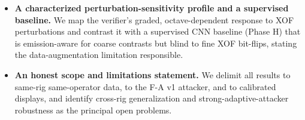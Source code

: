 \begin{itemize}
  \item \textbf{A characterized perturbation-sensitivity profile and a supervised baseline.} We map the verifier's graded, octave-dependent response to XOF perturbations and contrast it with a supervised CNN baseline (Phase H) that is emission-aware for coarse contrasts but blind to fine XOF bit-flips, stating the data-augmentation limitation responsible.

  \item \textbf{An honest scope and limitations statement.} We delimit all results to same-rig same-operator data, to the F-A v1 attacker, and to calibrated displays, and identify cross-rig generalization and strong-adaptive-attacker robustness as the principal open problems.
\end{itemize}
